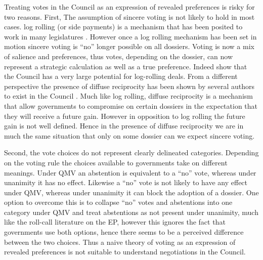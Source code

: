 Treating votes in the Council as an expression of revealed preferences is risky for two reasons. First, The assumption  of sincere voting is not likely to hold in most cases. log rolling (or side payments) is a mechanism that has been posited to work in many legislatures \citep{CarrubaVolden2000,MattilaLane2001}. However once a log rolling mechanism has been set in motion sincere voting is ``no'' longer possible on all dossiers. Voting is now a mix of salience and preferences, thus votes, depending on the dossier, can now represent a strategic calculation as well as a true preference. Indeed \citet{KonigJunge2009} show that the Council has a very large potential for log-rolling deals. From a different perspective the presence of diffuse reciprocity \citep{Keohane1986} has been shown by several authors to exist in the Council \citep{Lewis1998,Lewis2003,Jonsson2000}. Much like log rolling, diffuse reciprocity is a mechanism that allow governments to compromise on certain dossiers in the expectation that they will receive a future gain. However in opposition to log rolling the future gain is not well defined. Hence in the presence of diffuse reciprocity we are in much the same situation that only on some dossier can we expect sincere voting.  

Second, the vote choices do not represent clearly delineated categories. Depending on the voting rule the choices available to governments take on different meanings. Under QMV an abstention is equivalent to a ``no'' vote, whereas under unanimity it has no effect. Likewise a ``no'' vote is not likely to have any effect under QMV, whereas under unanimity it can block the adoption of a dossier. One option to overcome this is to collapse ``no'' votes and abstentions into one category under QMV and treat abstentions as not present under unanimity, much like the roll-call literature on the EP, however this ignores the fact that governments use both options, hence there seems to be a perceived difference between the two choices. Thus a naive theory of voting as an expression of revealed preferences is not suitable to understand negotiations in the Council. 


